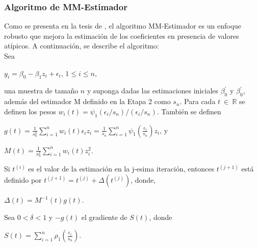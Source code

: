 \subsubsection{ Algoritmo de MM-Estimador \parencite{zacarias-2023} }
Como se presenta en la tesis de \textcite{zacarias-2023}, el algoritmo MM-Estimador es un enfoque robusto que mejora la estimación de los coeficientes en presencia de valores atípicos. A continuación, se describe el algoritmo:\\

Sea\\
\begin{center}
 $ y_{i} = \beta_{0} -\beta_{1}z_{i} + \epsilon_{i} $, $1 \leq i \leq n $,\\
\end{center}

una muestra de tamaño $n$ y suponga dadas las estimaciones iniciales $\beta_{0}^{'}$ y $\beta_{0}^{'}$, además del estimador M definido en la Etapa 2 como $s_{n}$. Para cada $t \: \in  \: \mathbb{R} $ se definen los pesos
$w_{i}(t) = \psi_{1} (\epsilon_{i} /s_{n}) /(\epsilon_{i} /s_{n})$. También se definen \\


\begin{center}
	{\large $g(t) = \frac{1}{s_{n}^{2}} \sum_{i=1}^{n} w_{i}( t )\epsilon_{i} z_{i} =  \frac{1}{s_{n}}  \sum_{i=1}^{n} \psi_{1} (\frac{\epsilon_{i}}{s_{n}}) z_{i}$}, y \\	
\end{center}

\begin{center}
	{\large$ M(t) = \frac{1}{s_{n}^{2}}  \sum_{i=1}^{n}  w_{i}( t ) z_{i}^{2} $}.\\
\end{center}





Si $t^{(i)}$ es el valor de la estimación en la j-esima iteración, entonces $t^{(j+1)}$ está definido por $t^{(j+1)} = t^{(j)} + \Delta ( t^{(j)})$, donde,\\

\begin{center}
	$\Delta ( t) = M^{-1}(t)g(t)$.\\
\end{center}

Sea $0< \delta  < 1$  y $-g(t)$ el gradiente de $S(t)$, donde \\

\begin{center}
	{\large$S(t) = \sum_{i=1}^{n} \rho_{1} ( \frac{\epsilon_{i}}{s_{n}})$}. \\
\end{center}


